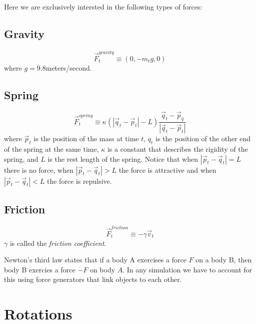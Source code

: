 \documentclass[12pt]{article}
\begin{document}
Here we are exclusively intersted in the following types of forces:

\subsection{Gravity}

\begin{equation}
\vec F_t^{gravity} \equiv (0, -m_t g, 0) 
\end{equation}
where $g = 9.8$meters/second.

\subsection{Spring}

\begin{equation}
  \vec F_t^{spring} \equiv \kappa (|\vec q_t - \vec p_t|-L) \frac{\vec q_t-\vec p_q}{|\vec q_t-\vec p_t|}
\end{equation}
where $\vec p_t$ is the position of the mass at time $t$, $q_t$ is the position of the other end of the spring at the same time, $\kappa$ is a constant that describes the rigidity of the spring, and $L$ is the rest length of the spring. Notice that when $|\vec p_t - \vec q_t|=L$ there is no force, when $|\vec p_t - \vec q_t|>L$ the force is attractive and when $|\vec p_t - \vec q_t|<L$ the force is repulsive. 

\subsection{Friction}

\begin{equation}
  \vec F_t^{friction} \equiv - \gamma \vec v_t
\end{equation}
$\gamma$ is called the {\it friction coefficient}.

Newton's third law states that if a body A exercises a force $F$ on a body B, then body B exercies a force $-F$ on body $A$. In any simulation we have to account for this using force generators that link objects to each other.

\section{Rotations}
\end{document}

